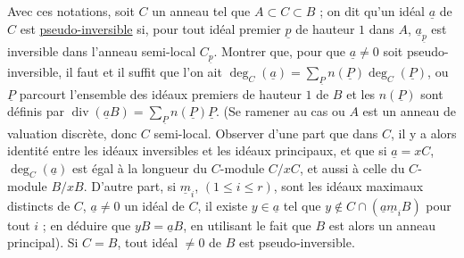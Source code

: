 Avec ces notations, soit $C$ un anneau tel que $A\subset C\subset B$ ; on dit qu'un idéal $\underline a$ de $C$ est \uline{pseudo-inversible} si, pour tout idéal premier $\underline p$ de hauteur $1$ dans $A$, $\underline a_{\underline p}$ est inversible dans l'anneau semi-local $C_{\underline p}$. Montrer que, pour que $\underline a\ne 0$ soit pseudo-inversible, il faut et il suffit que l'on ait $\deg_C(\underline a)=\sum_{\underline P}n(\underline P)\deg_C(\underline P)$, o\rlap{\handwritten{\`{\phantom{u}}}}u $\underline P$ parcourt l'ensemble des idéaux premiers de hauteur $1$ de $B$ et les $n(\underline P)$ sont définis par $\operatorname{div}(\underline a B)=\sum_{\underline P}n(\underline P)\underline P$. (Se ramener au cas o\rlap{\handwritten{\`{\phantom{u}}}}u $A$ est un anneau de valuation discrète, donc $C$ semi-local. Observer d'une part que dans $C$, il y a alors identité entre les idéaux inversibles et les idéaux principaux, et que si $\underline a=xC$, $\deg_C(\underline a)$ est égal à la longueur du $C$-module $C/xC$, et aussi à celle du $C$-module $B/xB$. D'autre part, si $\underline m_i$, $(1\leq i\leq r)$, sont les idéaux maximaux distincts de $C$, $\underline a\ne 0$ un idéal de $C$, il existe $y\in\underline a$ tel que $y\notin C\cap(\underline a\underline m_i B)$ pour tout $i$ ; en déduire que $yB=\underline a B$, en utilisant le fait que $B$ est alors un anneau principal). Si $C=B$, tout idéal $\ne 0$ de $B$ est pseudo-inversible.

